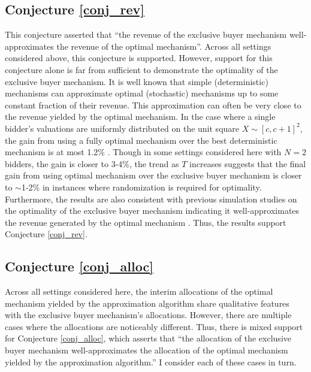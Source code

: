 \subsection{Conjecture \ref{conj_rev}}

This conjecture asserted that ``the revenue of the exclusive buyer mechanism well-approximates the revenue of the optimal mechanism''. Across all settings considered above, this conjecture is supported. However, support for this conjecture alone is far from sufficient to demonstrate the optimality of the exclusive buyer mechanism. It is well known that simple (deterministic) mechanisms can approximate optimal (stochastic) mechanisms up to some constant fraction of their revenue. This approximation can often be very close to the revenue yielded by the optimal mechanism. In the case where a single bidder's valuations are uniformly distributed on the unit square $X \sim [c,c+1]^2$, the gain from using a fully optimal mechanism over the best deterministic mechanism is at most 1.2\% \autocite[p11]{pavlov2011optimal}. Though in some settings considered here with $N=2$ bidders, the gain is closer to 3-4\%, the trend as $T$ increases suggests that the final gain from using optimal mechanism over the exclusive buyer mechanism is closer to $\sim$1-2\% in instances where randomization is required for optimality. Furthermore, the results are also consistent with previous simulation studies on the optimality of the exclusive buyer mechanism indicating it well-approximates the revenue generated by the optimal mechanism \autocite{belloni2010multidimensional}. Thus, the results support Conjecture \ref{conj_rev}.

\subsection{Conjecture \ref{conj_alloc}}

Across all settings considered here, the interim allocations of the optimal mechanism yielded by the approximation algorithm share qualitative features with the exclusive buyer mechanism's allocations. However, there are multiple cases where the allocations are noticeably different. Thus, there is mixed support for Conjecture \ref{conj_alloc}, which asserts that ``the allocation of the exclusive buyer mechanism well-approximates the allocation of the optimal mechanism yielded by the approximation algorithm.'' I consider each of these cases in turn.

